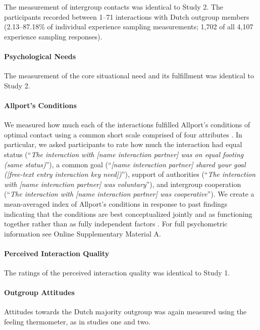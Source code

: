 The measurement of intergroup contacts was identical to Study 2. The
participants recorded between 1--71 interactions with Dutch outgroup
members (2.13--87.18\% of individual experience sampling measurements;
1,702 of all 4,107 experience sampling responses).

\paragraph{Psychological Needs}

The measurement of the core situational need and its fulfillment was
identical to Study 2.

\paragraph{Allport's Conditions}

We measured how much each of the interactions fulfilled Allport's
conditions of optimal contact using a common short scale comprised of
four attributes \citep{Islam1993, Voci2003, AlRamiah2012a}. In
particular, we asked participants to rate how much the interaction had
equal status
(``\textit{The interaction with [name interaction partner] was on equal footing (same status)}''),
a common goal
(``\textit{[name interaction partner] shared your goal ([free-text entry interaction key need])}''),
support of authorities
(``\textit{The interaction with [name interaction partner] was voluntary}''),
and intergroup cooperation
(``\textit{The interaction with [name interaction partner] was cooperative}'').
We create a mean-averaged index of Allport's conditions in response to
past findings indicating that the conditions are best conceptualized
jointly and as functioning together rather than as fully independent
factors \citep[][, p. 766]{Pettigrew2006}. For full psychometric
information see Online Supplementary Material A.

\paragraph{Perceived Interaction Quality}

The ratings of the perceived interaction quality was identical to Study
1.

\paragraph{Outgroup Attitudes}

Attitudes towards the Dutch majority outgroup was again measured using
the feeling thermometer, as in studies one and two.


